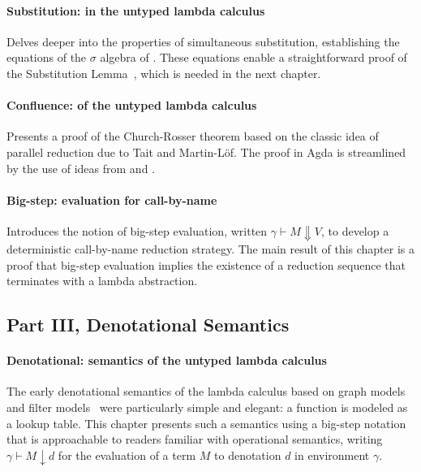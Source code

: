 \documentclass[preprint,authoryear]{elsarticle}
\begin{document}
\paragraph{Substitution: in the untyped lambda calculus}
Delves deeper into the properties of simultaneous substitution,
establishing the equations of the $\sigma$ algebra of
\citet{Abadi-1991}. These equations enable a straightforward proof of
the Substitution Lemma~\citep{Barendregt-1984}, which is needed in the
next chapter.

\paragraph{Confluence: of the untyped lambda calculus}
Presents a proof of the Church-Rosser theorem based on the classic
idea of parallel reduction due to Tait and Martin-L\"of. The proof in
Agda is streamlined by the use of ideas from
\citet{Schafer-Tebbi-Smolka-2015} and \citet{Pfenning-1992}.

\paragraph{Big-step: evaluation for call-by-name}
Introduces the notion of big-step evaluation, written $\gamma \vdash M
\Downarrow V$, to develop a deterministic call-by-name reduction
strategy. The main result of this chapter is a proof that big-step
evaluation implies the existence of a reduction sequence that
terminates with a lambda abstraction.

\subsection*{Part III, Denotational Semantics}

\paragraph{Denotational: semantics of the untyped lambda calculus}
The early denotational semantics of the lambda calculus based on graph
models~\citep{Scott-1976,Engeler-1981,Plotkin-1993} and filter
models~\citep{Barendregt-1983} were particularly simple and elegant: a
function is modeled as a lookup table.  This chapter presents such a
semantics using a big-step notation that is approachable to readers
familiar with operational semantics, writing $\gamma \vdash M
\downarrow d$ for the evaluation of a term $M$ to denotation $d$ in
environment $\gamma$.
\end{document}
